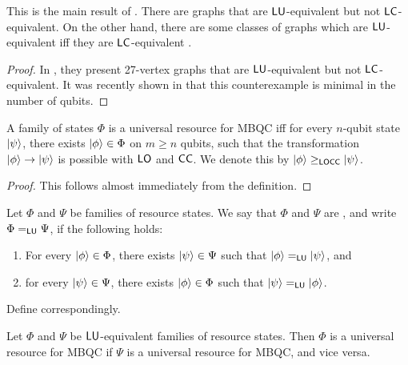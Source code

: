 \begin{theorem}
This is the main result of \cite{lu-lc-false}. There are graphs that are $\mathsf{LU}$-equivalent but not $\mathsf{LC}$-equivalent. On the other hand, there are some classes of graphs which are $\mathsf{LU}$-equivalent iff they are $\mathsf{LC}$-equivalent \cite{lu-equal-lc-example-1,lu-equal-lc-example-2}.
\end{theorem}

\begin{proof}
In \cite{lu-lc-false}, they present 27-vertex graphs that are $\mathsf{LU}$-equivalent but not $\mathsf{LC}$-equivalent. It was recently shown in \cite{lu-lc-counter-minimal} that this counterexample is minimal in the number of qubits.
\end{proof}

\begin{theorem}
A family of states $\Phi$ is a universal resource for MBQC iff for every $n$-qubit state $\ket\psi$, there exists $\ket\phi \in \Phi$ on $m \geq n$ qubits, such that the transformation $\ket\phi \to \ket\psi$ is possible with $\mathsf{LO}$ and $\mathsf{CC}$. We denote this by $\ket\phi \geq_{\mathsf{LOCC}} \ket\psi$. 
\end{theorem}

\begin{proof}
This follows almost immediately from the definition.
\end{proof}

\begin{definition}
Let $\Phi$ and $\Psi$ be families of resource states. We say that $\Phi$ and
$\Psi$ are , and write $\Phi =_{\mathsf{LU}} \Psi$, if the following holds:
\begin{enumerate}
    \item For every $\ket{\phi}\in\Phi$, there exists $\ket{\psi}\in\Psi$ such
    that $\ket{\phi}=_{\mathsf{LU}}\ket{\psi}$, and
    \item for every $\ket{\psi}\in\Psi$, there exists $\ket{\phi}\in\Phi$ such
    that $\ket{\psi}=_{\mathsf{LU}}\ket{\phi}$.
\end{enumerate}
Define  correspondingly.
\end{definition}

\begin{lemma}
\label{lem:lu-equivalent-families-universality}
Let $\Phi$ and $\Psi$ be $\mathsf{LU}$-equivalent families of resource states. Then $\Phi$ is a universal resource for MBQC if $\Psi$ is a universal resource for MBQC, and vice versa.
\end{lemma}

